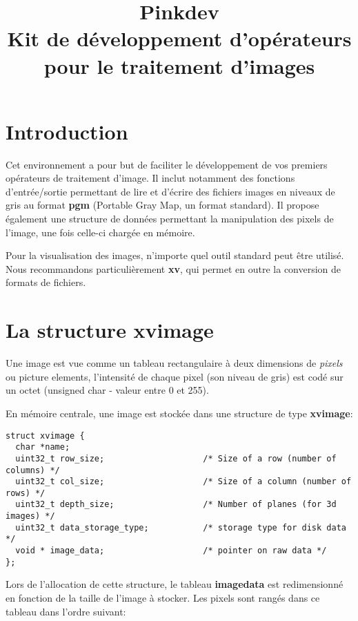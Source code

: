 


\title{Pinkdev\\
Kit de d\'eveloppement d'op\'erateurs pour le traitement d'images
}

\section{Introduction}

Cet environnement a pour but de faciliter le d\'eveloppement
de vos premiers op\'erateurs de traitement d'image. Il inclut 
notamment des fonctions d'entr\'ee/sortie permettant de lire
et d'\'ecrire des fichiers images en niveaux de gris au format 
{\bf pgm} (Portable Gray Map, un format standard). Il propose \'egalement
une structure de donn\'ees permettant la manipulation des pixels
de l'image, une fois celle-ci charg\'ee en m\'emoire.

Pour la visualisation des images, n'importe quel outil standard
peut \^etre utilis\'e. Nous recommandons 
particuli\`erement {\bf xv}, qui permet en outre la conversion 
de formats de fichiers.

\section{La structure xvimage}

Une image est vue comme un tableau rectangulaire \`a deux 
dimensions de {\it pixels} ou picture elements, 
l'intensit\'e de chaque pixel (son niveau de gris) est cod\'e
sur un octet (unsigned char - valeur entre 0 et 255).

En m\'emoire centrale, une image est stock\'ee dans une structure
de type {\bf xvimage}:

\begin{verbatim}
struct xvimage {
  char *name;
  uint32_t row_size;                    /* Size of a row (number of columns) */
  uint32_t col_size;                    /* Size of a column (number of rows) */
  uint32_t depth_size;                  /* Number of planes (for 3d images) */
  uint32_t data_storage_type;           /* storage type for disk data */
  void * image_data;                    /* pointer on raw data */
};
\end{verbatim}

Lors de l'allocation de cette structure, le tableau {\bf imagedata}
est redimensionn\'e en fonction de la taille de l'image \`a 
stocker. Les pixels sont rang\'es dans ce tableau dans l'ordre
suivant:

